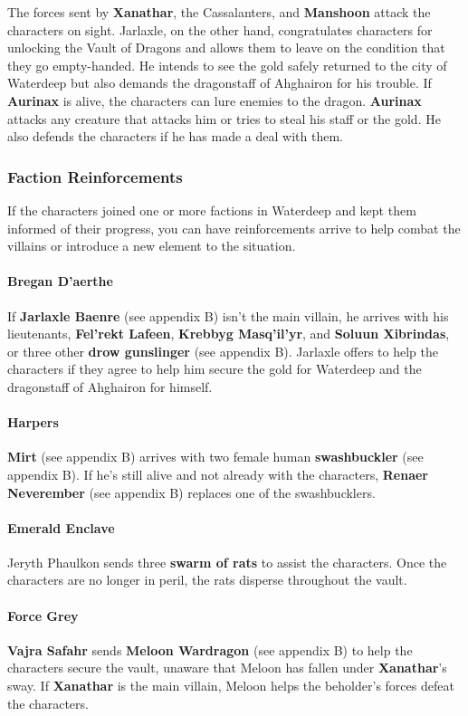 \documentclass[10pt,a4paper,twoside,twocolumn,openany,nodeprecatedcode]{dndbook}
\begin{document}
The forces sent by \textbf{Xanathar}, the Cassalanters, and \textbf{Manshoon} attack the characters on sight. Jarlaxle, on the other hand, congratulates characters for unlocking the Vault of Dragons and allows them to leave on the condition that they go empty-handed. He intends to see the gold safely returned to the city of Waterdeep but also demands the dragonstaff of Ahghairon for his trouble.
If \textbf{Aurinax} is alive, the characters can lure enemies to the dragon. \textbf{Aurinax} attacks any creature that attacks him or tries to steal his staff or the gold. He also defends the characters if he has made a deal with them.
\subsubsection{Faction Reinforcements}
If the characters joined one or more factions in Waterdeep and kept them informed of their progress, you can have reinforcements arrive to help combat the villains or introduce a new element to the situation.
\paragraph{Bregan D'aerthe}
If \textbf{Jarlaxle Baenre} (see appendix B) isn't the main villain, he arrives with his lieutenants, \textbf{Fel'rekt Lafeen}, \textbf{Krebbyg Masq'il'yr}, and \textbf{Soluun Xibrindas}, or three other \textbf{drow gunslinger} (see appendix B). Jarlaxle offers to help the characters if they agree to help him secure the gold for Waterdeep and the dragonstaff of Ahghairon for himself.
\paragraph{Harpers}
\textbf{Mirt} (see appendix B) arrives with two female human \textbf{swashbuckler} (see appendix B). If he's still alive and not already with the characters, \textbf{Renaer Neverember} (see appendix B) replaces one of the swashbucklers.
\paragraph{Emerald Enclave}
Jeryth Phaulkon sends three \textbf{swarm of rats} to assist the characters. Once the characters are no longer in peril, the rats disperse throughout the vault.
\paragraph{Force Grey}
\textbf{Vajra Safahr} sends \textbf{Meloon Wardragon} (see appendix B) to help the characters secure the vault, unaware that Meloon has fallen under \textbf{Xanathar}'s sway. If \textbf{Xanathar} is the main villain, Meloon helps the beholder's forces defeat the characters.
\end{document}
